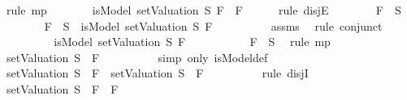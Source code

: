 \begin{isabellebody}
\ {\isacharparenleft}rule\ mp{\isacharparenright}\isanewline
\ \ \ \ \isamarkupfalse%
\ \isamarkupfalse%
\ {\isachardoublequoteopen}isModel\ {\isacharparenleft}setValuation\ S{\isacharparenright}\ {\isacharparenleft}F{}\ \isactrlbold {\isasymor}\ F{}{\isacharparenright}{\isachardoublequoteclose}\isanewline
\ \ \ \ \isamarkupfalse%
\ {\isacharparenleft}rule\ disjE{\isacharparenright}\isanewline
\ \ \ \ \ \ \isamarkupfalse%
\ {\isachardoublequoteopen}F{}\ {\isasymin}\ S{\isachardoublequoteclose}\isanewline
\ \ \ \ \ \ \isamarkupfalse%
\ {\isachardoublequoteopen}F{}\ {\isasymin}\ S\ {\isasymlongrightarrow}\ isModel\ {\isacharparenleft}setValuation\ S{\isacharparenright}\ F{}{\isachardoublequoteclose}\isanewline
\ \ \ \ \ \ \ \ \isamarkupfalse%
\ assms{\isacharparenleft}{}{\isacharparenright}\ \isamarkupfalse%
\ {\isacharparenleft}rule\ conjunct{}{\isacharparenright}\isanewline
\ \ \ \ \ \ \isamarkupfalse%
\ \isamarkupfalse%
\ {\isachardoublequoteopen}isModel\ {\isacharparenleft}setValuation\ S{\isacharparenright}\ F{}{\isachardoublequoteclose}\ \isanewline
\ \ \ \ \ \ \ \ \isamarkupfalse%
\ {\isacartoucheopen}F{}\ {\isasymin}\ S{\isacartoucheclose}\ \isamarkupfalse%
\ {\isacharparenleft}rule\ mp{\isacharparenright}\isanewline
\ \ \ \ \ \ \isamarkupfalse%
\ \isamarkupfalse%
\ {\isachardoublequoteopen}{\isacharparenleft}setValuation\ S{\isacharparenright}\ {\isasymTurnstile}\ F{}{\isachardoublequoteclose}\isanewline
\ \ \ \ \ \ \ \ \isamarkupfalse%
\ {\isacharparenleft}simp\ only{\isacharcolon}\ isModel{\isacharunderscore}def{\isacharparenright}\isanewline
\ \ \ \ \ \ \isamarkupfalse%
\ \isamarkupfalse%
\ {\isachardoublequoteopen}{\isacharparenleft}setValuation\ S{\isacharparenright}\ {\isasymTurnstile}\ F{}\ {\isasymor}\ {\isacharparenleft}setValuation\ S{\isacharparenright}\ {\isasymTurnstile}\ F{}{\isachardoublequoteclose}\isanewline
\ \ \ \ \ \ \ \ \isamarkupfalse%
\ {\isacharparenleft}rule\ disjI{}{\isacharparenright}\isanewline
\ \ \ \ \ \ \isamarkupfalse%
\ \isamarkupfalse%
\ {\isachardoublequoteopen}{\isacharparenleft}setValuation\ S{\isacharparenright}\ {\isasymTurnstile}\ {\isacharparenleft}F{}\ \isactrlbold {\isasymor}\ F{}{\isacharparenright}{\isachardoublequoteclose}\isanewline

\end{isabellebody}
